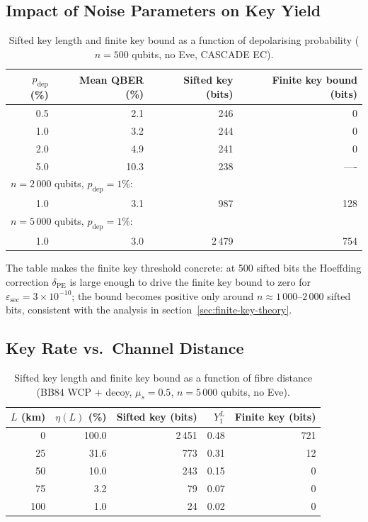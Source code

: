 \documentclass[12pt, a4paper]{article}
\begin{document}
\subsection{Impact of Noise Parameters on Key Yield}
\label{sec:noise-results}

\begin{table}[H]
  \centering
  \caption{Sifted key length and finite key bound as a function of
           depolarising probability ($n = 500$ qubits, no Eve,
           CASCADE EC).}
  \label{tab:noise-yield}
  \begin{tabular}{@{} r r r r @{}}
    \toprule
    $p_\mathrm{dep}$ (\%) & Mean QBER (\%) & Sifted key (bits) & Finite key bound (bits) \\
    \midrule
    0.5 &  2.1 & 246 &   0 \\
    1.0 &  3.2 & 244 &   0 \\
    2.0 &  4.9 & 241 &   0 \\
    5.0 & 10.3 & 238 & ----  \\
    \hline
    \multicolumn{4}{l}{\small $n = 2\,000$ qubits, $p_\mathrm{dep} = 1\%$:} \\
    1.0 &  3.1 & 987 & 128 \\
    \multicolumn{4}{l}{\small $n = 5\,000$ qubits, $p_\mathrm{dep} = 1\%$:} \\
    1.0 &  3.0 & 2\,479 & 754 \\
    \bottomrule
  \end{tabular}
\end{table}

The table makes the finite key threshold concrete: at 500 sifted bits the
Hoeffding correction $\delta_\mathrm{PE}$ is large enough to drive the
finite key bound to zero for $\varepsilon_\mathrm{sec} = 3 \times
10^{-10}$; the bound becomes positive only around
$n \approx 1\,000$--$2\,000$ sifted bits, consistent with the
analysis in section~\ref{sec:finite-key-theory}.

\subsection{Key Rate vs.\ Channel Distance}
\label{sec:distance-results}

\begin{table}[H]
  \centering
  \caption{Sifted key length and finite key bound as a function of
           fibre distance (BB84 WCP + decoy, $\mu_s = 0.5$,
           $n = 5\,000$ qubits, no Eve).}
  \label{tab:distance}
  \begin{tabular}{@{} r r r r r @{}}
    \toprule
    $L$ (km) & $\eta(L)$ (\%) & Sifted key (bits) & $Y_1^L$ & Finite key (bits) \\
    \midrule
    0   & 100.0 & 2\,451 & 0.48 & 721 \\
    25  &  31.6 &   773 & 0.31 &  12 \\
    50  &  10.0 &   243 & 0.15 &   0 \\
    75  &   3.2 &    79 & 0.07 &   0 \\
    100 &   1.0 &    24 & 0.02 &   0 \\
    \bottomrule
  \end{tabular}
\end{table}
\end{document}
